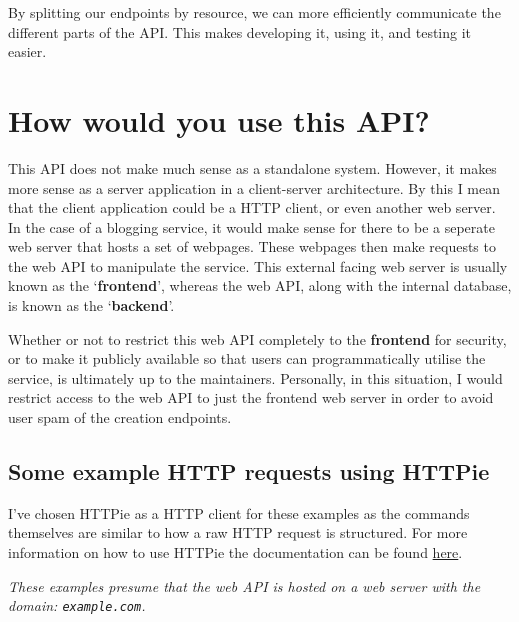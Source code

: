 By splitting our endpoints by resource, we can more efficiently communicate the different parts of the API. This makes developing it, using it, and testing it easier.

\section{How would you use this API?}

This API does not make much sense as a standalone system. However, it makes more sense as a server application in a client-server architecture. By this I mean that the client application could be a HTTP client, or even another web server. In the case of a blogging service, it would make sense for there to be a seperate web server that hosts a set of webpages. These webpages then make requests to the web API to manipulate the service. This external facing web server is usually known as the `\textbf{frontend}', whereas the web API, along with the internal database, is known as the `\textbf{backend}'.

Whether or not to restrict this web API completely to the \textbf{frontend} for security, or to make it publicly available so that users can programmatically utilise the service, is ultimately up to the maintainers. Personally, in this situation, I would restrict access to the web API to just the frontend web server in order to avoid user spam of the creation endpoints.

\subsection{Some example HTTP requests using HTTPie}

I've chosen HTTPie as a HTTP client for these examples as the commands themselves are similar to how a raw HTTP request is structured. For more information on how to use HTTPie the documentation can be found \href{https://httpie.io/docs/cli/examples}{here}.

\cprotect\textit{These examples presume that the web API is hosted on a web server with the domain: \verb|example.com|.}

